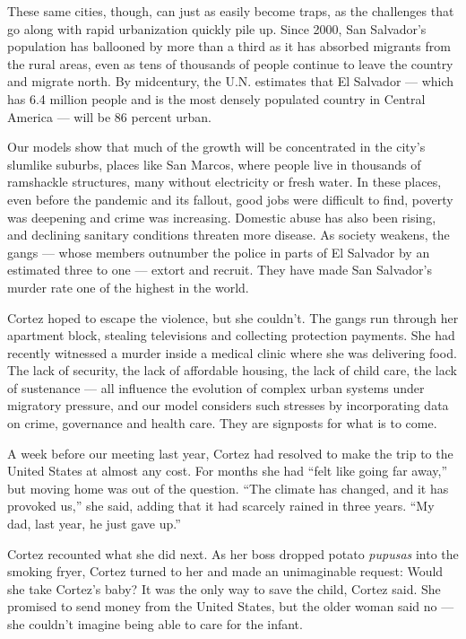 These same cities, though, can just as easily become traps, as the
challenges that go along with rapid urbanization quickly pile up. Since
2000, San Salvador's population has ballooned by more than a third as it
has absorbed migrants from the rural areas, even as tens of thousands of
people continue to leave the country and migrate north. By midcentury,
the U.N. estimates that El Salvador --- which has 6.4 million people and
is the most densely populated country in Central America --- will be 86
percent urban.

Our models show that much of the growth will be concentrated in the
city's slumlike suburbs, places like San Marcos, where people live in
thousands of ramshackle structures, many without electricity or fresh
water. In these places, even before the pandemic and its fallout, good
jobs were difficult to find, poverty was deepening and crime was
increasing. Domestic abuse has also been rising, and declining sanitary
conditions threaten more disease. As society weakens, the gangs ---
whose members outnumber the police in parts of El Salvador by an
estimated three to one --- extort and recruit. They have made San
Salvador's murder rate one of the highest in the world.

Cortez hoped to escape the violence, but she couldn't. The gangs run
through her apartment block, stealing televisions and collecting
protection payments. She had recently witnessed a murder inside a
medical clinic where she was delivering food. The lack of security, the
lack of affordable housing, the lack of child care, the lack of
sustenance --- all influence the evolution of complex urban systems
under migratory pressure, and our model considers such stresses by
incorporating data on crime, governance and health care. They are
signposts for what is to come.

A week before our meeting last year, Cortez had resolved to make the
trip to the United States at almost any cost. For months she had ``felt
like going far away,'' but moving home was out of the question. ``The
climate has changed, and it has provoked us,'' she said, adding that it
had scarcely rained in three years. ``My dad, last year, he just gave
up.''

Cortez recounted what she did next. As her boss dropped potato
\emph{pupusas} into the smoking fryer, Cortez turned to her and made an
unimaginable request: Would she take Cortez's baby? It was the only way
to save the child, Cortez said. She promised to send money from the
United States, but the older woman said no --- she couldn't imagine
being able to care for the infant.

